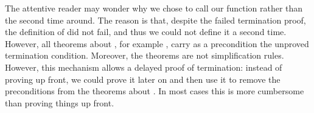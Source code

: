 \begin{isabellebody}
\begin{isamarkuptext}
The attentive reader may wonder why we chose to call our function 
rather than  the second time around. The reason is that, despite
the failed termination proof, the definition of  did not
fail, and thus we could not define it a second time. However, all theorems
about , for example , carry as a precondition
the unproved termination condition. Moreover, the theorems
 are not simplification rules. However, this mechanism
allows a delayed proof of termination: instead of proving
 up front, we could prove 
it later on and then use it to remove the preconditions from the theorems
about . In most cases this is more cumbersome than proving things
up front.
\end{isamarkuptext}%
\end{isabellebody}%
